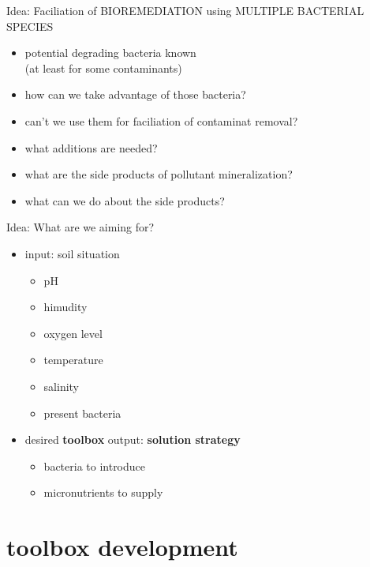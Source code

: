 \documentclass[style=aggie]{powerdot}
\begin{document}
\begin{slide}{Idea: Faciliation of BIOREMEDIATION using MULTIPLE BACTERIAL SPECIES}
\begin{itemize}
 \item potential degrading bacteria known\\ (at least for some contaminants)\newline
 \item how can we take advantage of those bacteria?\newline
 \item can't we use them for faciliation of contaminat removal?\newline
 \item what additions are needed?\newline
 \item what are the side products of pollutant mineralization?\newline
 \item what can we do about the side products?
\end{itemize}
\end{slide}

\begin{slide}{Idea: What are we aiming for?}
\begin{itemize}
 \item input: soil situation
 \begin{itemize}
  \item pH
  \item himudity
  \item oxygen level
  \item temperature
  \item salinity
  \item present bacteria
   \newline
 \end{itemize}

 \item desired \textbf{toolbox} output: \textbf{solution strategy}
 \begin{itemize}
  \item bacteria to introduce
  \item micronutrients to supply
 \end{itemize}

\end{itemize}
\end{slide}

\section{toolbox development}
\end{document}
